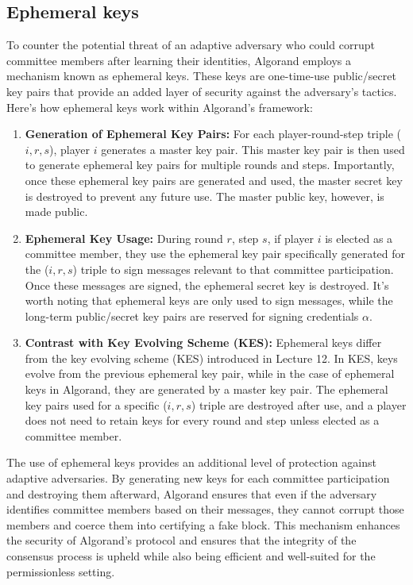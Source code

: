 \subsection{Ephemeral keys}
To counter the potential threat of an adaptive adversary who could corrupt committee members after learning their identities, Algorand employs a mechanism known as ephemeral keys. These keys are one-time-use public/secret key pairs that provide an added layer of security against the adversary's tactics.\\
Here's how ephemeral keys work within Algorand's framework:
\begin{enumerate}
	\item \textbf{Generation of Ephemeral Key Pairs:} For each player-round-step triple ($i, r, s$), player $i$ generates a master key pair. This master key pair is then used to generate ephemeral key pairs for multiple rounds and steps. Importantly, once these ephemeral key pairs are generated and used, the master secret key is destroyed to prevent any future use. The master public key, however, is made public.
	\item \textbf{Ephemeral Key Usage:} During round $r$, step $s$, if player $i$ is elected as a committee member, they use the ephemeral key pair specifically generated for the ($i, r, s$) triple to sign messages relevant to that committee participation. Once these messages are signed, the ephemeral secret key is destroyed. It's worth noting that ephemeral keys are only used to sign messages, while the long-term public/secret key pairs are reserved for signing credentials $\alpha$.
	\item \textbf{Contrast with Key Evolving Scheme (KES):} Ephemeral keys differ from the key evolving scheme (KES) introduced in Lecture 12. In KES, keys evolve from the previous ephemeral key pair, while in the case of ephemeral keys in Algorand, they are generated by a master key pair. The ephemeral key pairs used for a specific ($i, r, s$) triple are destroyed after use, and a player does not need to retain keys for every round and step unless elected as a committee member.
\end{enumerate}
The use of ephemeral keys provides an additional level of protection against adaptive adversaries. By generating new keys for each committee participation and destroying them afterward, Algorand ensures that even if the adversary identifies committee members based on their messages, they cannot corrupt those members and coerce them into certifying a fake block. This mechanism enhances the security of Algorand's protocol and ensures that the integrity of the consensus process is upheld while also being efficient and well-suited for the permissionless setting.

